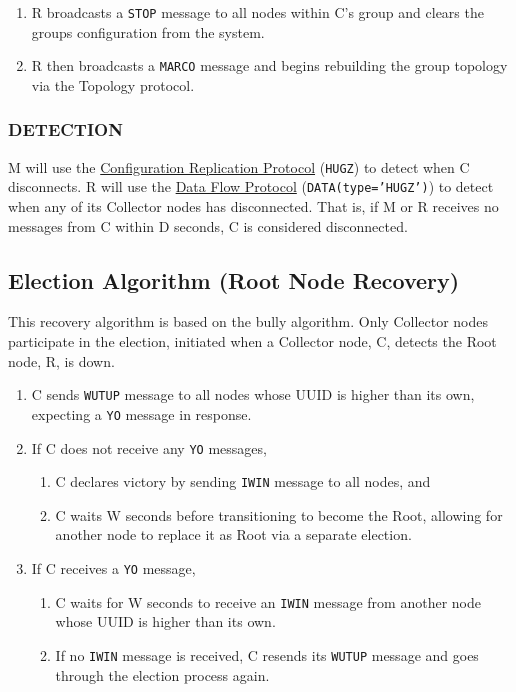 \begin{enumerate}
\item R broadcasts a \texttt{STOP} message to all nodes within C's group and clears the groups configuration from the
      \dcamp system.
\item R then broadcasts a \texttt{MARCO} message and begins rebuilding the group topology via the Topology protocol.
\end{enumerate}

\subsubsection{DETECTION}

M will use the \hyperref[proto_config]{Configuration Replication Protocol} (\texttt{HUGZ}) to detect when C disconnects.
R will use the \hyperref[proto_data]{Data Flow Protocol} (\texttt{DATA(type='HUGZ')}) to detect when any of its
Collector nodes has disconnected. That is, if M or R receives no messages from C within D seconds, C is considered
disconnected.

\subsection{Election Algorithm (Root Node Recovery)}
\label{algor_elect}

This recovery algorithm is based on the bully algorithm\cite{needed}. Only Collector nodes participate in the election,
initiated when a Collector node, C, detects the Root node, R, is down.

\begin{enumerate}
\item C sends \texttt{WUTUP} message to all nodes whose UUID is higher than its own, expecting a \texttt{YO} message in
      response.
\item If C does not receive any \texttt{YO} messages,
      \begin{enumerate}
      \item C declares victory by sending \texttt{IWIN} message to all nodes, and
      \item C waits W seconds before transitioning to become the Root, allowing for another node to replace it as Root
            via a separate election.
      \end{enumerate}
\item If C receives a \texttt{YO} message,
      \begin{enumerate}
      \item C waits for W seconds to receive an \texttt{IWIN} message from another node whose UUID is higher than its
            own.
      \item If no \texttt{IWIN} message is received, C resends its \texttt{WUTUP} message and goes through the election
            process again.
      \end{enumerate}
\end{enumerate}

